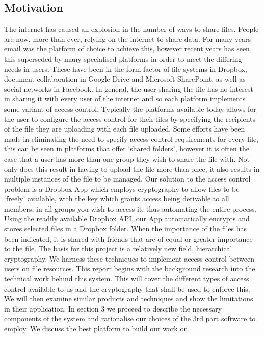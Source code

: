 \documentclass[12pt, titlepage]{article}
\begin{document}
\subsection{Motivation}
The internet has caused an explosion in the number of ways to share files. People are now, more than ever, relying on the internet to share data. For many years email was the platform of choice to achieve this, however recent years has seen this superseded by many specialised platforms in order to meet the differing needs in users. These have been in the form factor of file systems in Dropbox, document collaboration in Google Drive and Microsoft SharePoint, as well as social networks in Facebook. In general, the user sharing the file has no interest in sharing it with every user of the internet and so each platform implements some variant of access control. Typically the platforms available today allows for the user to configure the access control for their files by specifying the recipients of the file they are uploading with each file uploaded. Some efforts have been made in eliminating the need to specify access control requirements for every file, this can be seen in platforms that offer `shared folders', however it is often the case that a user has more than one group they wish to share the file with. Not only does this result in having to upload the file more than once, it also results in multiple instances of the file to be managed. Our solution to the access control problem is a Dropbox App which employs cryptography to allow files to be `freely' available, with the key which grants access being derivable to all members, in all groups you wish to access it, thus automating the entire process. Using the readily available Dropbox API, our App automatically encrypts and stores selected files in a Dropbox folder. When the importance of the files has been indicated, it is shared with friends that are of equal or greater importance to the file. 
\newline \indent The basis for this project is a relatively new field, hierarchical cryptography. We harness these techniques to implement access control between users on file resources.
\newline
\newline \indent This report begins with the background research into the technical work behind this system. This will cover the different types of access control available to us and the cryptography that shall be used to enforce this. We will then examine similar products and techniques and show the limitations in their application. In section 3 we proceed to describe the necessary components of the system and rationalise our choices of the 3rd part software to employ. We discuss the best platform to build our work on.
\end{document}
